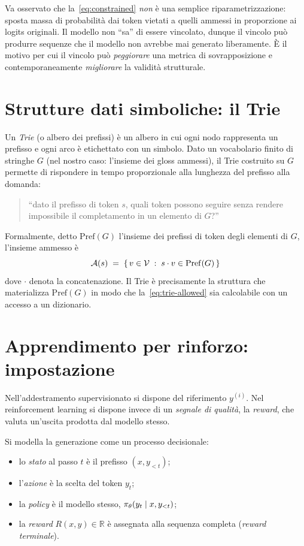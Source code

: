 Va osservato che la~\eqref{eq:constrained} \emph{non} è una semplice
riparametrizzazione: sposta massa di probabilità dai token vietati a quelli
ammessi in proporzione ai logits originali. Il modello non ``sa'' di essere
vincolato, dunque il vincolo può produrre sequenze che il modello non avrebbe
mai generato liberamente. È il motivo per cui il vincolo può \emph{peggiorare}
una metrica di sovrapposizione e contemporaneamente \emph{migliorare} la
validità strutturale.

\section{Strutture dati simboliche: il Trie}

Un \emph{Trie} (o albero dei prefissi) è un albero in cui ogni nodo rappresenta
un prefisso e ogni arco è etichettato con un simbolo. Dato un vocabolario finito
di stringhe $G$ (nel nostro caso: l'insieme dei gloss ammessi), il Trie
costruito su $G$ permette di rispondere in tempo proporzionale alla lunghezza
del prefisso alla domanda:
\begin{quote}
  ``dato il prefisso di token $s$, quali token possono seguire senza rendere
  impossibile il completamento in un elemento di $G$?''
\end{quote}

Formalmente, detto $\mathrm{Pref}(G)$ l'insieme dei prefissi di token degli
elementi di $G$, l'insieme ammesso è
\begin{equation}
  \label{eq:trie-allowed}
  \mathcal{A}(s) \;=\; \{\, v \in \mathcal{V} \;:\; s \cdot v \in \mathrm{Pref}(G) \,\}
\end{equation}
dove $\cdot$ denota la concatenazione. Il Trie è precisamente la struttura che
materializza $\mathrm{Pref}(G)$ in modo che la~\eqref{eq:trie-allowed} sia
calcolabile con un accesso a un dizionario.

\section{Apprendimento per rinforzo: impostazione}

Nell'addestramento supervisionato si dispone del riferimento $y^{(i)}$. Nel
reinforcement learning si dispone invece di un \emph{segnale di qualità}, la
\emph{reward}, che valuta un'uscita prodotta dal modello stesso.

Si modella la generazione come un processo decisionale:
\begin{itemize}
  \item lo \emph{stato} al passo $t$ è il prefisso $(x, y_{<t})$;
  \item l'\emph{azione} è la scelta del token $y_t$;
  \item la \emph{policy} è il modello stesso, $\pi_\theta(y_t \mid x, y_{<t})$;
  \item la \emph{reward} $R(x, y) \in \mathbb{R}$ è assegnata alla sequenza
        completa (\emph{reward terminale}).
\end{itemize}

